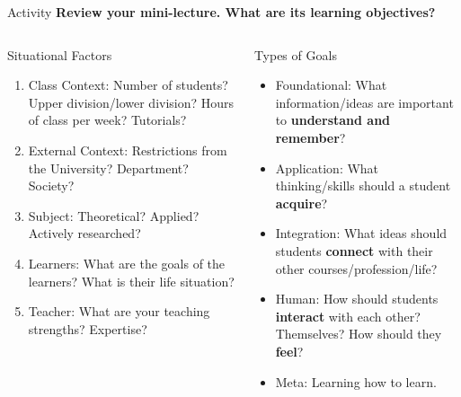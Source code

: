\documentclass[10pt, aspectratio=169, t]{beamer}
\begin{document}
\begin{frame}{Activity}
	\textcolor{mLightGreen}{\textbf{Review your mini-lecture. What are its learning objectives?}}

	\vspace{-.5cm}
\begin{columns}
\begin{column}{0.5\textwidth}
	\begin{block}{Situational Factors}
		\begin{enumerate}
			\item \alert{Class Context}: Number of students? Upper division/lower division?
				Hours of class per week? Tutorials?
			
			\item \alert{External Context}: Restrictions from the University? Department? Society?

			\item \alert{Subject}: Theoretical? Applied? Actively researched?
			
			\item \alert{Learners}: What are the goals of the learners? What is their life situation?

			\item \alert{Teacher}: What are your teaching strengths? Expertise?

			
		\end{enumerate}
	\end{block}
\end{column}
\begin{column}{0.5\textwidth}  %
	\begin{block}{Types of Goals}
		\begin{itemize}
			\item \alert{Foundational}: What information/ideas are important to \textbf{understand and remember}? 
			\item \alert{Application}: What thinking/skills should a student \textbf{acquire}? 
			\item \alert{Integration}: What ideas should students \textbf{connect} with their other courses/profession/life?
			\item \alert{Human}: How should students \textbf{interact} with each other? Themselves? How should they \textbf{feel}? 
			\item \alert{Meta}: Learning how to learn. 
		\end{itemize}
	\end{block}
\end{column}
\end{columns}
\end{frame}
\end{document}
